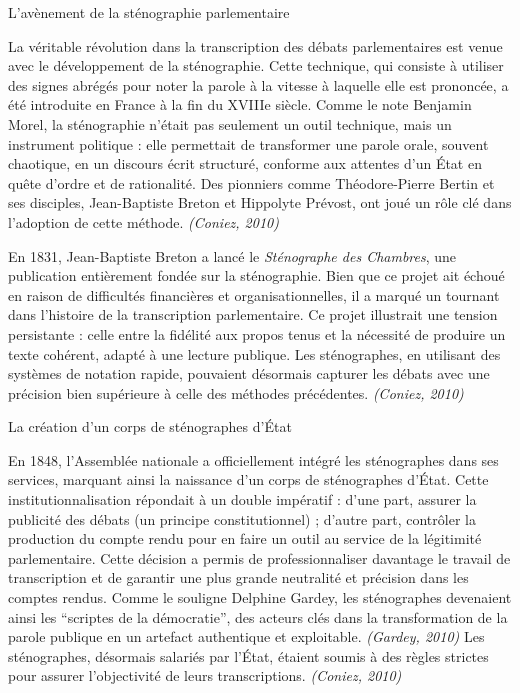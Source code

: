  L'avènement de la sténographie parlementaire

La véritable révolution dans la transcription des débats parlementaires est venue avec le développement de la sténographie. Cette technique, qui consiste à utiliser des signes abrégés pour noter la parole à la vitesse à laquelle elle est prononcée, a été introduite en France à la fin du XVIIIe siècle. Comme le note Benjamin Morel, la sténographie n’était pas seulement un outil technique, mais un instrument politique : elle permettait de transformer une parole orale, souvent chaotique, en un discours écrit structuré, conforme aux attentes d’un État en quête d’ordre et de rationalité. Des pionniers comme Théodore-Pierre Bertin et ses disciples, Jean-Baptiste Breton et Hippolyte Prévost, ont joué un rôle clé dans l'adoption de cette méthode. \emph{(Coniez, 2010)}

En 1831, Jean-Baptiste Breton a lancé le \emph{Sténographe des Chambres}, une publication entièrement fondée sur la sténographie. Bien que ce projet ait échoué en raison de difficultés financières et organisationnelles, il a marqué un tournant dans l'histoire de la transcription parlementaire. Ce projet illustrait une tension persistante : celle entre la fidélité aux propos tenus et la nécessité de produire un texte cohérent, adapté à une lecture publique. Les sténographes, en utilisant des systèmes de notation rapide, pouvaient désormais capturer les débats avec une précision bien supérieure à celle des méthodes précédentes. \emph{(Coniez, 2010)}

 La création d'un corps de sténographes d'État

En 1848, l'Assemblée nationale a officiellement intégré les sténographes dans ses services, marquant ainsi la naissance d'un corps de sténographes d'État. Cette institutionnalisation répondait à un double impératif : d’une part, assurer la publicité des débats (un principe constitutionnel) ; d’autre part, contrôler la production du compte rendu pour en faire un outil au service de la légitimité parlementaire. Cette décision a permis de professionnaliser davantage le travail de transcription et de garantir une plus grande neutralité et précision dans les comptes rendus. Comme le souligne Delphine Gardey, les sténographes devenaient ainsi les \enquote{scriptes de la démocratie}, des acteurs clés dans la transformation de la parole publique en un artefact authentique et exploitable. \emph{(Gardey, 2010)} Les sténographes, désormais salariés par l'État, étaient soumis à des règles strictes pour assurer l'objectivité de leurs transcriptions. \emph{(Coniez, 2010)}

